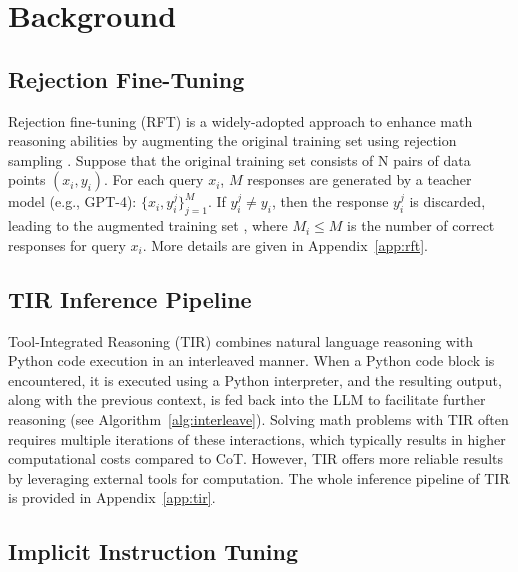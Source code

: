 \section{Background}\label{sec:preliminary}

\subsection{Rejection Fine-Tuning}\label{sec:RFT}
Rejection fine-tuning (RFT) is a widely-adopted approach to enhance math reasoning abilities by augmenting the original training set using rejection sampling \citep{RFT2023Yuan}.
Suppose that the original training set {\dorige} consists of N pairs of data points $(x_i, y_i)$.
For each query $x_i$, $M$ responses are generated by a teacher model (e.g., GPT-4): $\{x_i, y_i^j \}_{j=1}^M$.
If $y_i^j \neq y_i$, then the response $y_i^j$ is discarded, leading to the augmented training set {\dauge}, where $M_i \leq M$ is the number of correct responses for query $x_i$.
More details are given in Appendix~\ref{app:rft}.

\subsection{TIR Inference Pipeline}\label{sec:tir}
Tool-Integrated Reasoning (TIR) \citep{tora2023Gou} combines natural language reasoning with Python code execution in an interleaved manner.
When a Python code block is encountered, it is executed using a Python interpreter, and the resulting output, along with the previous context, is fed back into the LLM to facilitate further reasoning (see Algorithm~\ref{alg:interleave}). 
Solving math problems with TIR often requires multiple iterations of these interactions, which typically results in higher computational costs compared to CoT. 
However, TIR offers more reliable results by leveraging external tools for computation. 
The whole inference pipeline of TIR is provided in Appendix~\ref{app:tir}.




\subsection{Implicit Instruction Tuning}\label{sec:iit}

